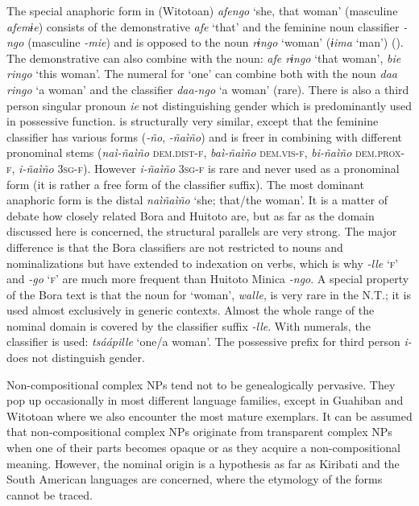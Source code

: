 \documentclass[output=collectionpaper]{langsci/langscibook}
\begin{document}
The special anaphoric form in  (Witotoan) \textit{afengo} ‘she, that woman’ (masculine \textit{afemɨe}) consists of the demonstrative \textit{afe} ‘that’ and the feminine noun classifier \textit{-ngo} (masculine \textit{-mie}) and is opposed to the noun \textit{rɨngo} ‘woman’ (\textit{ɨima} ‘man’) (\citealt{Minor1982}). The demonstrative can also combine with the noun: \textit{afe rɨngo} ‘that woman’, \textit{bie ringo} ‘this woman’. The numeral for ‘one’ can combine both with the noun \textit{daa ringo} ‘a woman’ and the classifier \textit{daa-ngo} ‘a woman’ (rare). There is also a third person singular pronoun \textit{ie} not distinguishing gender which is predominantly used in possessive function.  is structurally very similar, except that the feminine classifier has various forms (\textit{-ño}, \textit{-ñaìño})
and is freer in combining with different pronominal stems (\textit{naì-ñaìño} \textsc{dem.dist-f}, \textit{baì-ñaìño} \textsc{dem.vis-f}, \textit{bi-ñaìño} \textsc{dem.prox-f}, \textit{i-ñaìño} \textsc{3sg-f}). However \textit{i-ñaìño} \textsc{3sg-f} is rare and never used as a pronominal form (it is rather a free form of the classifier suffix). The most dominant anaphoric form is the distal \textit{naìñaìño} ‘she; that/the woman’. It is a matter of debate how closely related Bora and Huitoto are, but as far as the domain discussed here is concerned, the structural parallels are very strong. The major difference is that the Bora classifiers are not restricted to nouns and nominalizations but have extended to indexation on verbs, which is why  \textit{-lle} ‘\textsc{f}’ and  \textit{-go} ‘\textsc{f}’ are much more frequent than Huitoto Minica \textit{-ngo}. A special property of the Bora text is that the noun for ‘woman’, \textit{walle}, is very rare in the N.T.; it is used almost exclusively in generic contexts. Almost the whole range of the nominal domain is covered by the classifier suffix \textit{-lle}. With numerals, the classifier is used: \textit{tsáápille} ‘one/a woman’. The possessive prefix for third person \textit{i-} does not distinguish gender.

Non-compositional complex NPs tend not to be genealogically pervasive. They pop up occasionally in most different language families, except in Guahiban and Witotoan where we also encounter the most mature exemplars. It can be assumed that non-compositional complex NPs originate from transparent complex NPs when one of their parts becomes opaque or as they acquire a non-compositional meaning. However, the nominal origin is a hypothesis as far as Kiribati and the South American languages are concerned, where the etymology of the forms cannot be traced.
\end{document}

